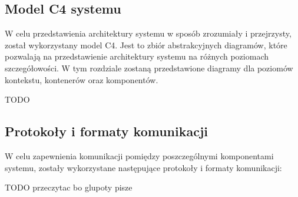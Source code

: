 \subsection{Model C4 systemu}

W celu przedstawienia architektury systemu w sposób zrozumiały i przejrzysty, został wykorzystany model C4. Jest to zbiór abstrakcyjnych diagramów, które pozwalają na przedstawienie architektury systemu na różnych poziomach szczegółowości. W tym rozdziale zostaną przedstawione diagramy dla poziomów kontekstu, kontenerów oraz komponentów.

TODO

\subsection{Protokoły i formaty komunikacji}

W celu zapewnienia komunikacji pomiędzy poszczególnymi komponentami systemu, zostały wykorzystane następujące protokoły i formaty komunikacji:

TODO przeczytac bo glupoty pisze

